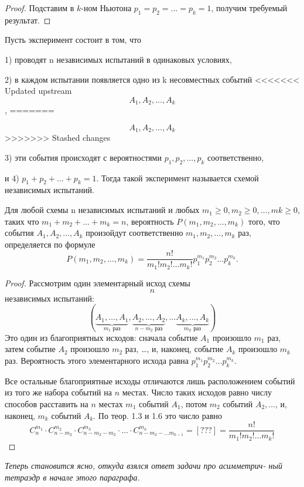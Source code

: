 \begin{proof}
	Подставим в $k$-ном Ньютона $p_1 = p_2 = \dots = p_k = 1$,
получим требуемый результат.
\end{proof}

\begin{definition}
	Пусть эксперимент состоит в том, что

1) проводят n независимых испытаний в одинаковых условиях,

2) в каждом испытании появляется одно из k несовместных событий
<<<<<<< Updated upstream
$$A_1, A_2,\dots, A_k$$,
=======
 
{$$A_1, A_2,\dots, A_k$$}
>>>>>>> Stashed changes

3) эти события происходят с вероятностями $p_1, p_2,\dots, p_k$ соответственно,

и 4) $p_1 + p_2 + \dots+ p_k = 1$.
Тогда такой эксперимент называется схемой независимых испытаний.
\end{definition}

\begin{theorem}
	Для любой схемы n независимых испытаний и любых \newline
$m_1 \geqslant 0, m_2 \geqslant 0,\dots  , mk \geqslant 0$, таких что $m_1 + m_2 +\dots  + m_k = n$, вероятность $P(m_1,m_2,\dots  ,m_k)$ того, что события $A_1, A_2,\dots  , A_k$ произойдут
соответственно $m_1,m_2,\dots  ,m_k$ раз, определяется по формуле
	\begin{equation*}
		P(m_1,m_2,\dots,m_k)=\frac{n!}{m_1!m_2!\dots m_k!}p_1^{m_1}p_2^{m_2}\dots p_k^{m_k}.
	\end{equation*}
\end{theorem}

\begin{proof}
Рассмотрим один элементарный исход схемы $$n$$ независимых испытаний:
\begin{equation*}
	(\underbrace{A_1,\ldots , A_1}_{m_1 \text{ раз}}, 
	\underbrace{A_2, \ldots,A_2}_{n-m_2 \text{ раз}},
	\ldots
	\underbrace{A_k,\ldots , A_k}_{m_k \text{ раз}})
\end{equation*}
Это один из благоприятных исходов: сначала событие $A_1$ произошло $m_1$ раз,
затем событие $A_2$ произошло $m_2$ раз, \dots, и, наконец, событие $A_k$ произошло
$m_k$ раз. Вероятность этого элементарного исхода равна 
$p^{m_1}_1p^{m_2}_2\ldots p^{m_k}_k$.

Все остальные благоприятные исходы отличаются лишь расположением
событий из того же набора событий на $n$ местах. Число таких исходов равно
числу способов расставить на $n$ местах $m_1$ событий $A_1$, потом $m_2$ событий
$A_2, \dots$, и, наконец, $m_k$ событий $A_k$. По теор. 1.3 и 1.6 это число равно
\begin{equation*}
	C_n^{m_1}\cdot C_{n-m_2}^{m_2}\cdot C_{n-m_2-m_2}^{m_3}\cdot\dots\cdot
	C_{n-m_2-\dots m_{k-1}}^{m_k}=
	\left[??? \right]=\frac{n!}{m_1!m_2!\ldots m_k!}
\end{equation*}
\end{proof}
\textit{Теперь становится ясно, откуда взялся ответ задачи про асимметрич-
ный тетраэдр в начале этого параграфа.}